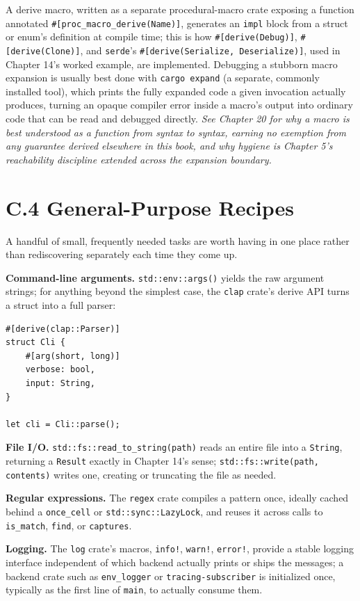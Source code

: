 \documentclass[11pt]{book}
\begin{document}
A derive macro, written as a separate procedural-macro crate exposing a function annotated \texttt{\#[proc\_macro\_derive(Name)]}, generates an \texttt{impl} block from a struct or enum's definition at compile time; this is how \texttt{\#[derive(Debug)]}, \texttt{\#[derive(Clone)]}, and \texttt{serde}'s \texttt{\#[derive(Serialize, Deserialize)]}, used in Chapter 14's worked example, are implemented. Debugging a stubborn macro expansion is usually best done with \texttt{cargo expand} (a separate, commonly installed tool), which prints the fully expanded code a given invocation actually produces, turning an opaque compiler error inside a macro's output into ordinary code that can be read and debugged directly. \emph{See Chapter 20 for why a macro is best understood as a function from syntax to syntax, earning no exemption from any guarantee derived elsewhere in this book, and why hygiene is Chapter 5's reachability discipline extended across the expansion boundary.}

\section*{C.4 General-Purpose Recipes}

A handful of small, frequently needed tasks are worth having in one place rather than rediscovering separately each time they come up.

\textbf{Command-line arguments.} \texttt{std::env::args()} yields the raw argument strings; for anything beyond the simplest case, the \texttt{clap} crate's derive API turns a struct into a full parser:

\begin{lstlisting}
#[derive(clap::Parser)]
struct Cli {
    #[arg(short, long)]
    verbose: bool,
    input: String,
}

let cli = Cli::parse();
\end{lstlisting}

\textbf{File I/O.} \texttt{std::fs::read\_to\_string(path)} reads an entire file into a \texttt{String}, returning a \texttt{Result} exactly in Chapter 14's sense; \texttt{std::fs::write(path, contents)} writes one, creating or truncating the file as needed.

\textbf{Regular expressions.} The \texttt{regex} crate compiles a pattern once, ideally cached behind a \texttt{once\_cell} or \texttt{std::sync::LazyLock}, and reuses it across calls to \texttt{is\_match}, \texttt{find}, or \texttt{captures}.

\textbf{Logging.} The \texttt{log} crate's macros, \texttt{info!}, \texttt{warn!}, \texttt{error!}, provide a stable logging interface independent of which backend actually prints or ships the messages; a backend crate such as \texttt{env\_logger} or \texttt{tracing-subscriber} is initialized once, typically as the first line of \texttt{main}, to actually consume them.
\end{document}

